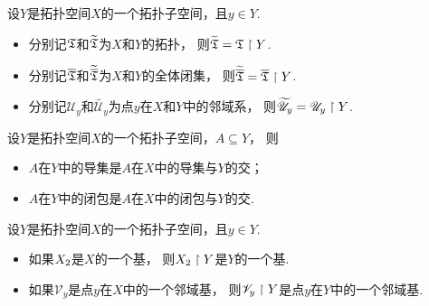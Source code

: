 \begin{theorem}
设\(Y\)是拓扑空间\(X\)的一个拓扑子空间，且\(y \in Y\).
\def\Uy{\mathscr{U}_y}
\def\wUy{\widetilde{\Uy}}
\begin{itemize}
	\item 分别记\({\mathfrak T}\)和\(\widetilde{{\mathfrak T}}\)为\(X\)和\(Y\)的拓扑，
	则\(\widetilde{{\mathfrak T}} = {\mathfrak T} \upharpoonright Y\).
	\item 分别记\(\overline{{\mathfrak T}}\)和\(\widetilde{\overline{{\mathfrak T}}}\)为\(X\)和\(Y\)的全体闭集，
	则\(\widetilde{\overline{{\mathfrak T}}} = \overline{{\mathfrak T}} \upharpoonright Y\).
	\item 分别记\(\Uy\)和\(\wUy\)为点\(y\)在\(X\)和\(Y\)中的邻域系，
	则\(\wUy = \Uy \SetRestrict Y\).
\end{itemize}
\end{theorem}

\begin{theorem}
设\(Y\)是拓扑空间\(X\)的一个拓扑子空间，\(A \subseteq Y\)，
则\begin{itemize}
	\item \(A\)在\(Y\)中的导集是\(A\)在\(X\)中的导集与\(Y\)的交；
	\item \(A\)在\(Y\)中的闭包是\(A\)在\(X\)中的闭包与\(Y\)的交.
\end{itemize}
\end{theorem}

\begin{theorem}
\def\Vy{\mathscr{V}_y}
设\(Y\)是拓扑空间\(X\)的一个拓扑子空间，且\(y \in Y\).
\begin{itemize}
	\item 如果\(X_2\)是\(X\)的一个基，
	则\(X_2 \upharpoonright Y\)是\(Y\)的一个基.
	\item 如果\(\Vy\)是点\(y\)在\(X\)中的一个邻域基，
	则\(\Vy \SetRestrict Y\)是点\(y\)在\(Y\)中的一个邻域基.
\end{itemize}
\end{theorem}

